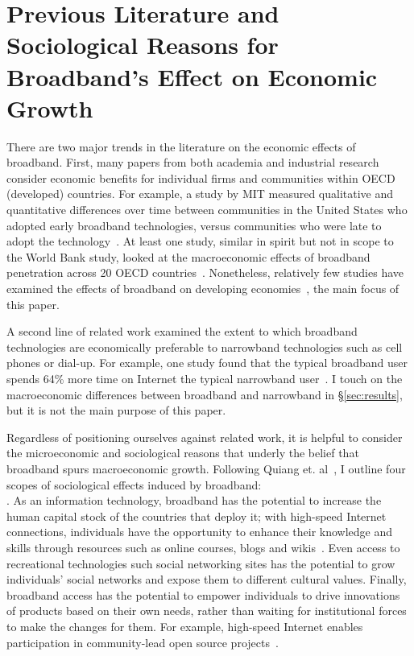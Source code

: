 \section{Previous Literature and Sociological Reasons for Broadband's Effect on Economic Growth}
\label{sec:sociology}

There are two major trends in the literature on the economic effects of broadband.
First, many papers from both academia and industrial research consider
economic benefits for individual firms and communities
within OECD (developed) countries. For example, a study by MIT measured
qualitative and quantitative differences over time between communities in the
United States who adopted early broadband technologies, versus communities who
were late to adopt the technology~\cite{gillett2006measuring}.
At least one study, similar in spirit but not in scope to the World Bank
study, looked at the macroeconomic effects of broadband penetration across
20 OECD countries~\cite{koutroumpis2009economic}. Nonetheless, relatively few
studies have examined the effects of broadband on developing
economies~\cite{qiang2010broadband}, the main focus of this paper.

A second line of related work examined the extent to which broadband technologies
are economically preferable to narrowband technologies such as cell phones or
dial-up. For example, one study found that the typical broadband user spends 64\%
more time on Internet the typical narrowband user~\cite{saksena2003igniting}.
I touch on the macroeconomic differences between broadband and narrowband in
\S\ref{sec:results}, but it is not the main purpose of this paper.

Regardless of positioning ourselves against related work, it is helpful to
consider the microeconomic and sociological reasons that underly the
belief that broadband spurs macroeconomic growth. Following Quiang et.
al~\cite{qiang2010broadband}, I outline four scopes of sociological effects
induced by broadband: \\

. As an information technology, broadband
 has the potential to increase the human capital stock of the countries that deploy it;
 with high-speed Internet connections, individuals have the opportunity to enhance their
 knowledge and skills through resources such as online courses, blogs and wikis~\cite{johnson2005next}.
 Even access to recreational technologies such social networking sites has the potential to grow individuals'
 social networks and expose them to different cultural values. Finally, broadband access has the potential to
 empower individuals to drive innovations of products based on their own needs, rather than waiting
 for institutional forces to make the changes for them.  For example, high-speed Internet
 enables participation in community-lead open source projects~\cite{von2009democratizing}.

